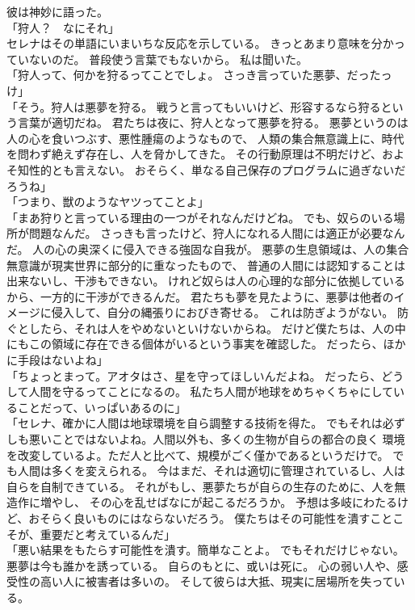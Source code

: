 \documentclass[../IHMain]{subfiles}
\begin{document}
彼は神妙に語った。\\
「狩人？　なにそれ」\\
セレナはその単語にいまいちな反応を示している。
きっとあまり意味を分かっていないのだ。
普段使う言葉でもないから。
私は聞いた。\\
「狩人って、何かを狩るってことでしょ。
さっき言っていた悪夢、だったっけ」\\
「そう。狩人は悪夢を狩る。
戦うと言ってもいいけど、形容するなら狩るという言葉が適切だね。
君たちは夜に、狩人となって悪夢を狩る。
悪夢というのは人の心を食いつぶす、悪性腫瘍のようなもので、
人類の集合無意識上に、時代を問わず絶えず存在し、人を脅かしてきた。
その行動原理は不明だけど、およそ知性的とも言えない。
おそらく、単なる自己保存のプログラムに過ぎないだろうね」\\
「つまり、獣のようなヤツってことよ」\\
「まあ狩りと言っている理由の一つがそれなんだけどね。
でも、奴らのいる場所が問題なんだ。
さっきも言ったけど、狩人になれる人間には適正が必要なんだ。
人の心の奥深くに侵入できる強固な自我が。
悪夢の生息領域は、人の集合無意識が現実世界に部分的に重なったもので、
普通の人間には認知することは出来ないし、干渉もできない。
けれど奴らは人の心理的な部分に依拠しているから、一方的に干渉ができるんだ。
君たちも夢を見たように、悪夢は他者のイメージに侵入して、自分の縄張りにおびき寄せる。
これは防ぎようがない。
防ぐとしたら、それは人をやめないといけないからね。
だけど僕たちは、人の中にもこの領域に存在できる個体がいるという事実を確認した。
だったら、ほかに手段はないよね」\\
「ちょっとまって。アオタはさ、星を守ってほしいんだよね。
だったら、どうして人間を守るってことになるの。
私たち人間が地球をめちゃくちゃにしていることだって、いっぱいあるのに」\\
「セレナ、確かに人間は地球環境を自ら調整する技術を得た。
でもそれは必ずしも悪いことではないよね。人間以外も、多くの生物が自らの都合の良く
環境を改変しているよ。ただ人と比べて、規模がごく僅かであるというだけで。
でも人間は多くを変えられる。
今はまだ、それは適切に管理されているし、人は自らを自制できている。
それがもし、悪夢たちが自らの生存のために、人を無造作に増やし、
その心を乱せばなにが起こるだろうか。
予想は多岐にわたるけど、おそらく良いものにはならないだろう。
僕たちはその可能性を潰すことこそが、重要だと考えているんだ」\\
「悪い結果をもたらす可能性を潰す。簡単なことよ。
でもそれだけじゃない。悪夢は今も誰かを誘っている。
自らのもとに、或いは死に。
心の弱い人や、感受性の高い人に被害者は多いの。
そして彼らは大抵、現実に居場所を失っている。
\end{document}

